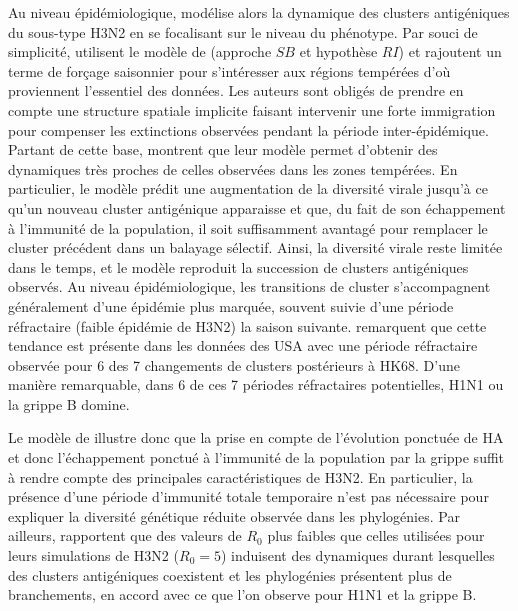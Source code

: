 Au niveau épidémiologique, \citet{Koelle2006} modélise alors la
dynamique des clusters antigéniques du sous-type H3N2 en se focalisant
sur le niveau du phénotype. Par souci de simplicité,
\citet{Koelle2006} utilisent le modèle de \citet{Gog2002} (approche
$SB$ et hypothèse $RI$) et rajoutent un terme de forçage saisonnier
pour s'intéresser aux régions tempérées d'où proviennent l'essentiel
des données. Les auteurs sont obligés de prendre en compte une
structure spatiale implicite faisant intervenir une forte immigration
pour compenser les extinctions observées pendant la période
inter-épidémique. Partant de cette base, \citet{Koelle2006} montrent
que leur modèle permet d'obtenir des dynamiques très proches de celles
observées dans les zones tempérées. En particulier, le modèle prédit
une augmentation de la diversité virale jusqu'à ce qu'un nouveau
cluster antigénique apparaisse et que, du fait de son échappement à
l'immunité de la population, il soit suffisamment avantagé pour
remplacer le cluster précédent dans un balayage sélectif. Ainsi, la
diversité virale reste limitée dans le temps, et le modèle reproduit
la succession de clusters antigéniques observés. Au niveau
épidémiologique, les transitions de cluster s'accompagnent
généralement d'une épidémie plus marquée, souvent suivie d'une période
réfractaire (faible épidémie de H3N2) la saison suivante.
\citet{Koelle2006} remarquent que cette tendance est présente dans les
données des USA avec une période réfractaire observée pour 6 des 7
changements de clusters postérieurs à HK68. D'une manière remarquable,
dans 6 de ces 7 périodes réfractaires potentielles, H1N1 ou la grippe
B domine.

Le modèle de \citet{Koelle2006} illustre donc que la prise en compte
de l'évolution ponctuée de HA et donc l'échappement ponctué à
l'immunité de la population par la grippe suffit à rendre compte des
principales caractéristiques de H3N2. En particulier, la présence
d'une période d'immunité totale temporaire n'est pas nécessaire pour
expliquer la diversité génétique réduite observée dans les
phylogénies.  Par ailleurs, \citet{Koelle2006} rapportent que des
valeurs de $R_0$ plus faibles que celles utilisées pour leurs
simulations de H3N2 ($R_0 =5$) induisent des dynamiques durant
lesquelles des clusters antigéniques coexistent et les phylogénies
présentent plus de branchements, en accord avec ce que l'on observe
pour H1N1 et la grippe B.


